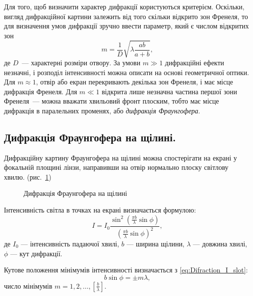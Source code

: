 Для того, щоб визначити характер дифракції користуються критерієм. Оскільки, вигляд дифракційної  картини залежить від того скільки відкрито зон Френеля, то для визначення умов дифракції зручно ввести параметр, який є числом відкритих зон
\begin{equation}\label{eq:m_number_of_zones}
    m =\frac1D{\sqrt{\lambda\frac{ab}{a + b}}},
\end{equation}
де $D$~--- характерні розміри отвору.  За умови $m\gg1$ дифракційні ефекти незначні, і розподіл інтенсивності можна описати на основі  геометричної оптики. Для $m\approx1$, отвір або екран перекривають декілька зон Френеля, і має місце дифракція Френеля. Для $m\ll1$ відкрита лише незначна частина першої зони Френеля~--- можна вважати хвильовий фронт плоским, тобто має місце дифракція в  паралельних променях, або \emph{дифракція Фраунгофера}.





\subsection*{Дифракція Фраунгофера на щілині.}


Дифракційну картину Фраунгофера на щілині можна спостерігати на екрані у фокальній площині лінзи, направивши на отвір нормально плоску світлову хвилю.
(рис.~\ref{pic:slot})

\begin{figure}[h!]\centering
    
    \caption{Дифракція Фраунгофера на щілині}
    \label{pic:slot}
\end{figure}


Інтенсивність світла в точках на екрані визначається формулою:
\begin{equation}\label{eq:Difraction_I_slot}
    I = I_0 \frac{\sin^2\left( {\frac{\pi b}{\lambda} \sin\phi}\right)}{\left( \frac{\pi b}{\lambda} \sin\phi\right)^2},
\end{equation}
де $I_0$ --- інтенсивність падаючої хвилі, $b$ --- ширина щілини, $\lambda$ --- довжина хвилі, $\phi$ --- кут дифракції.

Кутове положення мінімумів інтенсивності визначається з \eqref{eq:Difraction_I_slot}:
\begin{equation}\label{eq:Difraction_Slot_min}
    b\sin\phi=\pm m\lambda,
\end{equation}
число мінімумів $m = 1, 2, \ldots, \left[ \frac{b}{\lambda}\right]$.





